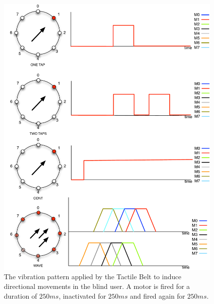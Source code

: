 \begin{figure}[ht!]
\centering
\includegraphics[width=1.0\textwidth]{pics/vibration_pattern_two_taps}
\caption{The vibration pattern applied by the Tactile Belt to induce directional movements in the blind user. A motor is fired for a duration of $250ms$, inactivated for $250ms$ and fired again for $250ms$.}
\label{fig:vibration_pattern_two_taps}
\end{figure}

